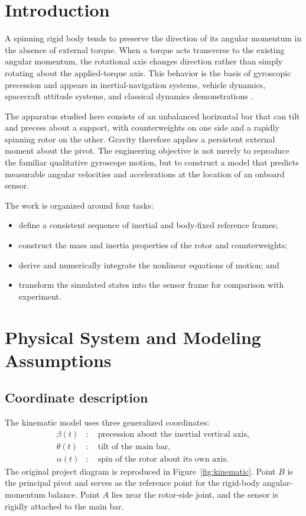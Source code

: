 \documentclass[11pt]{article}
\begin{document}
\setcounter{tocdepth}{1}
\tableofcontents
\clearpage
{}

\section{Introduction}
A spinning rigid body tends to preserve the direction of its angular momentum in the absence of external torque. When a torque acts transverse to the existing angular momentum, the rotational axis changes direction rather than simply rotating about the applied-torque axis. This behavior is the basis of gyroscopic precession and appears in inertial-navigation systems, vehicle dynamics, spacecraft attitude systems, and classical dynamics demonstrations \cite{openstax_precession,kostov2011}.

The apparatus studied here consists of an unbalanced horizontal bar that can tilt and precess about a support, with counterweights on one side and a rapidly spinning rotor on the other. Gravity therefore applies a persistent external moment about the pivot. The engineering objective is not merely to reproduce the familiar qualitative gyroscope motion, but to construct a model that predicts measurable angular velocities and accelerations at the location of an onboard sensor.

The work is organized around four tasks:
\begin{itemize}
    \item define a consistent sequence of inertial and body-fixed reference frames;
    \item construct the mass and inertia properties of the rotor and counterweights;
    \item derive and numerically integrate the nonlinear equations of motion; and
    \item transform the simulated states into the sensor frame for comparison with experiment.
\end{itemize}

\section{Physical System and Modeling Assumptions}
\subsection{Coordinate description}
The kinematic model uses three generalized coordinates:
\begin{align}
    \beta(t) &:\quad \text{precession about the inertial vertical axis},\\
    \theta(t) &:\quad \text{tilt of the main bar},\\
    \alpha(t) &:\quad \text{spin of the rotor about its own axis}.
\end{align}
The original project diagram is reproduced in Figure~\ref{fig:kinematic}. Point $B$ is the principal pivot and serves as the reference point for the rigid-body angular-momentum balance. Point $A$ lies near the rotor-side joint, and the sensor is rigidly attached to the main bar.
\end{document}
